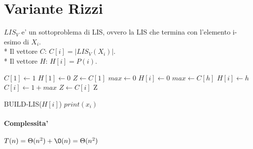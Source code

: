 \section{Variante Rizzi}

$LIS_V$ e' un sottoproblema di LIS, ovvero la LIS che termina con l'elemento i-esimo di $X_i$. \\*
Il vettore $C$: $C[i] = |LIS_V(X_i)|$. \\*
Il vettore $H$: $H[i] = P(i)$. \\

\begin{algorithm}
    \begin{algorithmic}
            \State $C[1] \gets 1$
            \State $H[1] \gets 0$
            \State $Z \gets C[1]$
                \State $max \gets 0$
                \State $H[i] \gets 0$
                        \State $max \gets C[h]$
                        \State $H[i] \gets h$
                    \EndIf
                \EndFor
                \State $C[i] \gets 1 + max$
                    \State $Z \gets C[i]$
                \EndIf
            \EndFor
            \State \Return Z
        \EndProcedure
    \end{algorithmic}
\end{algorithm}

\begin{algorithm}
    \begin{algorithmic}
                \State BUILD-LIS($H[i]$)
            \EndIf
            \State $print(x_i)$
        \EndProcedure
    \end{algorithmic}
\end{algorithm}

\paragraph{Complessita'}
$T(n) = \Theta(n^2) + \O(n) = \Theta(n^2)$